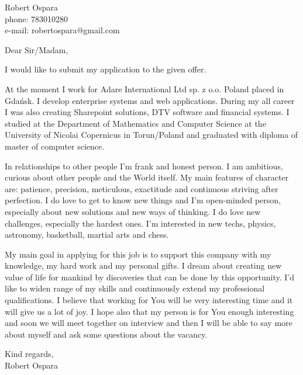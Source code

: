 \documentclass[a4paper,12pt]{letter}
\begin{document}
 
\begin{letter}{Robert Ospara \\ phone: 783010280 \\ e-mail: robertospara@gmail.com}


\opening{Dear Sir/Madam,} 
 
I would like to submit my application to the given offer.

At the moment I work for Adare International Ltd sp. z o.o. Poland placed in Gda\'{n}sk. I develop enterprise systems and web applications.
During my all career I was also creating Sharepoint solutions, DTV software and financial systems. 
I studied at the Department of Mathematics and Computer Science at the University of Nicolai Copernicus in Torun/Poland and graduated with 
diploma of master of computer science.

In relationships to other people I'm frank and honest person.
I am ambitious, curious about other people and the World itself. My main features of character are: patience, 
precision, meticulous, exactitude and continuous striving after perfection. I do love to get to know new things and 
I’m open-minded person, especially about new solutions and new ways of thinking. I do love new challenges, especially the hardest ones. 
I’m interested in new techs, physics, astronomy, basketball, martial arts and chess. 

My main goal in applying for this job is to support this company with my knowledge, my hard work and my personal gifts. 
I dream about creating new value of life for mankind by discoveries that can be done by this opportunity. 
I'd like to widen range of my skills and continuously extend my professional qualifications. 
I believe that working for You will be very interesting time and it will give us a lot of joy. 
I hope also that my person is for You enough interesting and soon we will meet together on interview and then 
I will be able to say more about myself and ask some questions about the vacancy.
 
Kind regards, \\
Robert Ospara 


\end{letter}
\end{document}
